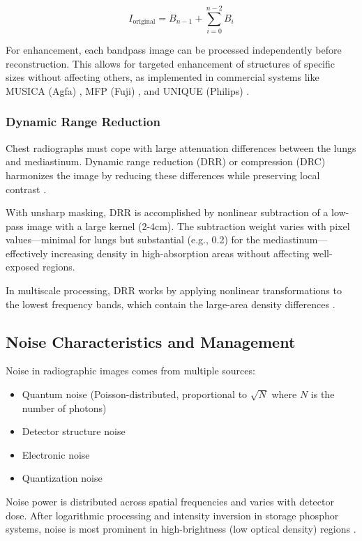 \documentclass[nomenclature, english, bibtex]{kththesis}
\numberwithin{listing}{chapter}
\begin{document}
\begin{equation}
I_{\text{original}} = B_{n-1} + \sum_{i=0}^{n-2} B_i
\end{equation}

For enhancement, each bandpass image can be processed independently before reconstruction. This allows for targeted enhancement of structures of specific sizes without affecting others, as implemented in commercial systems like MUSICA (Agfa) \cite{vuylsteke1994multiscale}, MFP (Fuji) \cite{ogoda1997unsharp}, and UNIQUE (Philips) \cite{stahl2000digital}.

\subsubsection{Dynamic Range Reduction}
Chest radiographs must cope with large attenuation differences between the lungs and mediastinum. Dynamic range reduction (DRR) or compression (DRC) harmonizes the image by reducing these differences while preserving local contrast \cite{cowen1988computer,prokop2003principles}.

With unsharp masking, DRR is accomplished by nonlinear subtraction of a low-pass image with a large kernel (2-4cm). The subtraction weight varies with pixel values—minimal for lungs but substantial (e.g., 0.2) for the mediastinum—effectively increasing density in high-absorption areas without affecting well-exposed regions.

In multiscale processing, DRR works by applying nonlinear transformations to the lowest frequency bands, which contain the large-area density differences \cite{stahl2000digital}.

\subsection{Noise Characteristics and Management}
Noise in radiographic images comes from multiple sources:
\begin{itemize}
    \item Quantum noise (Poisson-distributed, proportional to $\sqrt{N}$ where $N$ is the number of photons)
    \item Detector structure noise
    \item Electronic noise
    \item Quantization noise
\end{itemize}

Noise power is distributed across spatial frequencies and varies with detector dose. After logarithmic processing and intensity inversion in storage phosphor systems, noise is most prominent in high-brightness (low optical density) regions \cite{hillen1987imaging,ogawa1995quantitative}.
\end{document}
